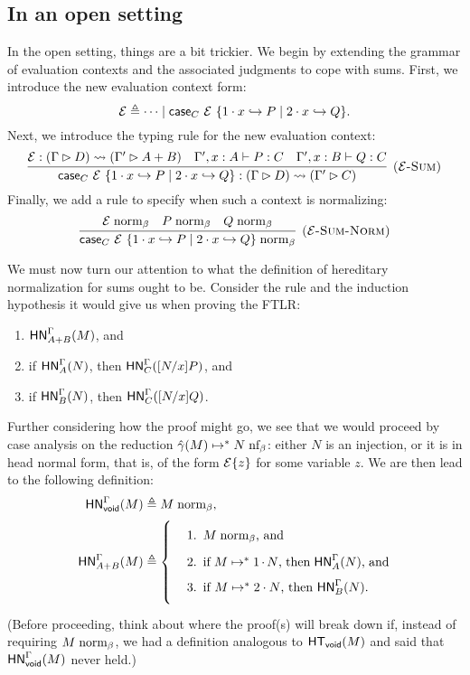 \documentclass{article}
\begin{document}
\subsection{In an open setting}

In the open setting, things are a bit trickier.
We begin by extending the grammar of evaluation contexts and the associated judgments to cope with sums.
First, we introduce the new evaluation context form:
\[
  \mathcal{E} \triangleq \dotsb \mid \mathsf{case}_{C}\ \mathcal{E}\ \{1\cdot x \hookrightarrow P \mid 2\cdot x \hookrightarrow Q\}.
\]
Next, we introduce the typing rule for the new evaluation context:
\[
  \infer[\rn{$\E$-Sum}]{
    \hasC{\scase{C}{\E}{x}{P}{Q}}{\Gamma}{D}{\Gamma'}{C}
  }{
    \hasC{\E}{\Gamma}{D}{\Gamma'}{A + B}
    &
    \hasEF{\Gamma', x:A}{P}{C}
    &
    \hasEF{\Gamma', x:B}{Q}{C}
  }
\]
Finally, we add a rule to specify when such a context is normalizing:
\[
  \infer[\rn{$\E$-Sum-Norm}]{
    \bnorm{\scase{C}{\E}{x}{P}{Q}}
  }{
    \bnorm{\E}
    &
    \bnorm{P}
    &
    \bnorm{Q}
  }
\]

We must now turn our attention to what the definition of hereditary normalization for sums ought to be.
Consider the rule  and the induction hypothesis it would give us when proving the FTLR:
\begin{enumerate}
\item $\mathsf{HN}^{\Gamma}_{A + B}(M)$, and
\item if $\mathsf{HN}^{\Gamma}_{A}(N)$, then $\mathsf{HN}^{\Gamma}_{C}([N/x]P)$, and
\item if $\mathsf{HN}^{\Gamma}_{B}(N)$, then $\mathsf{HN}^{\Gamma}_{C}([N/x]Q)$.
\end{enumerate}
Further considering how the proof might go, we see that we would proceed by case analysis on the reduction $\hat\gamma(M) \mapsto^* N \mathrel{\text{nf}_\beta}$: either $N$ is an injection, or it is in head normal form, that is, of the form $\mathcal{E}\{z\}$ for some variable $z$.
We are then lead to the following definition:
\begin{align*}
  \hnorm{\Gamma}{\void}{M} &\triangleq \bnorm{M},\\
  \hnorm{\Gamma}{A+B}{M} &\triangleq \left\{\parbox{0.5\linewidth}{\begin{enumerate}
      \item $\bnorm{M}$, and
      \item if $\steps{M}{\inl{N}}$, then $\hnorm{\Gamma}{A}{N}$, and
      \item if $\steps{M}{\inr{N}}$, then $\hnorm{\Gamma}{B}{N}$.
      \end{enumerate}}\right.
\end{align*}
(Before proceeding, think about where the proof(s) will break down if, instead of requiring $M \mathrel{\text{norm}_\beta}$, we had a definition analogous to $\mathsf{HT}_{\mathsf{void}}(M)$ and said that $\mathsf{HN}^{\Gamma}_{\mathsf{void}}(M)$ never held.)
\end{document}
